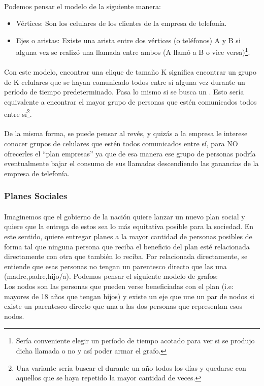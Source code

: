 \paragraph{}
Podemos pensar el modelo de la siguiente manera:
\begin{itemize}
  \item Vértices: Son los celulares de los clientes de la empresa de telefonía.
  \item Ejes o aristas: Existe una arista entre dos vértices (o teléfonos) A y B si alguna vez se realizó una llamada entre ambos (A llamó a B o vice versa)\footnote{Sería conveniente elegir un período de tiempo acotado para ver si se produjo dicha llamada o no y así poder armar el grafo.}.
\end{itemize}

\paragraph{}
Con este modelo, encontrar una clique de tamaño K significa encontrar un grupo de K celulares que se hayan comunicado todos entre sí alguna vez durante un período de tiempo predeterminado. Pasa lo mismo si se busca un \mc. Esto sería equivalente a encontrar el mayor grupo de personas que estén comunicados todos entre sí\footnote{Una variante sería buscar el \mc durante un año todos los días y quedarse con aquellos que se haya repetido la mayor cantidad de veces.}.

\paragraph{}
De la misma forma, se puede pensar al revés, y quizás a la empresa le interese conocer grupos de celulares que estén todos comunicados entre sí, para NO ofrecerles el ``plan empresas'' ya que de esa manera ese grupo de personas podría eventualmente bajar el consumo de sus llamadas descendiendo las ganancias de la empresa de telefonía.

\subsubsection{Planes Sociales}

\paragraph{}
Imaginemos que el gobierno de la nación quiere lanzar un nuevo plan social y quiere que la entrega de estos sea lo más equitativa posible para la sociedad. En este sentido, quiere entregar planes a la mayor cantidad de personas posibles de forma tal que ninguna persona que reciba el beneficio del plan esté relacionada directamente con otra que también lo reciba. Por relacionada directamente, se entiende que esas personas no tengan un parentesco directo que las una (madre,padre,hijo/a). Podemos pensar el siguiente modelo de grafos:\\
Los nodos son las personas que pueden verse beneficiadas con el plan (i.e: mayores de 18 años que tengan hijos) y existe un eje que une un par de nodos si existe un parentesco directo que una a las dos personas que representan esos nodos.

